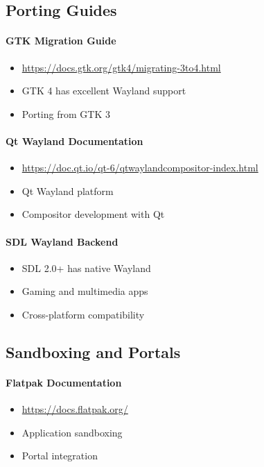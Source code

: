 \subsection{Porting Guides}

\paragraph{GTK Migration Guide}
\begin{itemize}
    \item \url{https://docs.gtk.org/gtk4/migrating-3to4.html}
    \item GTK 4 has excellent Wayland support
    \item Porting from GTK 3
\end{itemize}

\paragraph{Qt Wayland Documentation}
\begin{itemize}
    \item \url{https://doc.qt.io/qt-6/qtwaylandcompositor-index.html}
    \item Qt Wayland platform
    \item Compositor development with Qt
\end{itemize}

\paragraph{SDL Wayland Backend}
\begin{itemize}
    \item SDL 2.0+ has native Wayland
    \item Gaming and multimedia apps
    \item Cross-platform compatibility
\end{itemize}

\subsection{Sandboxing and Portals}

\paragraph{Flatpak Documentation}
\begin{itemize}
    \item \url{https://docs.flatpak.org/}
    \item Application sandboxing
    \item Portal integration
\end{itemize}

